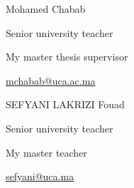 \begin{Parallel}[v]{0.48\textwidth}{0.48\textwidth}
{\begin{cvhonors}
     
                 \cvhonor
    {Mohamed Chabab} %
    {
    	\begin{cvitems} %
    		\item {}
    		\item {Senior university teacher}
    		\item {My master thesis supervisor}
    		\item { \href{mailto:mchabab@uca.ac.ma}{ mchabab@uca.ac.ma \faEnvelope} }
    \end{cvitems}}
    { }
    {} %

    
    
        \cvhonor
        {SEFYANI LAKRIZI Fouad} %
            {
      \begin{cvitems} %
              \item {}
        \item {Senior university teacher}
      \item {My master teacher}
        \item { \href{mailto:sefyani@uca.ma}{sefyani@uca.ma \faEnvelope} }
      \end{cvitems}}
   { }
    {} %
    
    

\end{cvhonors}
}
\ParallelPar
\end{Parallel}
